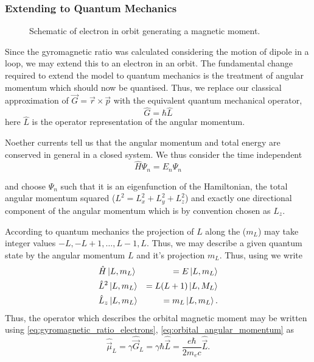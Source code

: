 \subsubsection{Extending to Quantum Mechanics}
\begin{wrapfigure}{r}{0.4\textwidth}%
	\begin{center}
		
		\caption{Schematic of electron in orbit generating a magnetic moment.}%
	\end{center}
\end{wrapfigure}%
Since the gyromagnetic ratio was calculated considering the motion of dipole in a loop, we may extend this to an electron in an orbit.
The fundamental change required to extend the model to quantum mechanics is the treatment of angular momentum which should now be quantised.
Thus, we replace our classical approximation of $\vec{G} = \vec{r} \times \vec{p}$ with the equivalent quantum mechanical operator,
\begin{equation}
	\hat{G} = \hbar \hat{L}
	\label{eq:orbital_angular_momentum}
\end{equation}
here $\hat{L}$ is the operator representation of the angular momentum.

Noether currents tell us that the angular momentum and total energy are conserved in general in a closed system.
We thus consider the time independent 
\begin{equation}
	\hat{H} \Psi_n = E_n \Psi_n
	\label{eq:TISE}
\end{equation}

and choose $\Psi_n$ such that it is an eigenfunction of the Hamiltonian, the total angular momentum squared ($L^2 = L_x^2 + L_y^2 + L_z^2$) and exactly one directional component of the angular momentum which is by convention chosen as $L_z$.

According to quantum mechanics the projection of $L$ along the  ($m_L$) may take integer values $-L, -L + 1, \dots, L-1, L$.
Thus, we may describe a given quantum state by the angular momentum $L$ and it's projection $m_L$. Thus, using  we write
\begin{eqnarray}
	&\hat{H}\ket{L, m_L} &= E\ket{L, m_L} \\
	&\hat{L}^2\ket{L, m_L} &= L(L+1)\ket{L, M_L} \\
	&\hat{L}_z\ket{L, m_L} &= m_L\ket{L, m_L}. \label{eq:zthcomponent}
\end{eqnarray}
Thus, the operator which describes the orbital magnetic moment may be written using  \eqref{eq:gyromagnetic_ratio_electrons}, \eqref{eq:orbital_angular_momentum} as
\begin{equation}
	\hat{\vec{\mu}}_L = \gamma \hat{\vec{G}}_L = \gamma \hbar \hat{\vec{L}} = \frac{e\hbar}{2m_e c}\hat{\vec{L}}.
	\label{eq:orbital_magnetic_moment_operator}
\end{equation}

